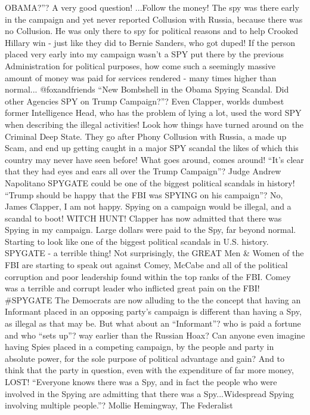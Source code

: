 OBAMA?''? A very good question! ...Follow the money! The spy was there
early in the campaign and yet never reported Collusion with Russia,
because there was no Collusion. He was only there to spy for political
reasons and to help Crooked Hillary win - just like they did to Bernie
Sanders, who got duped! If the person placed very early into my campaign
wasn't a SPY put there by the previous Administration for political
purposes, how come such a seemingly massive amount of money was paid for
services rendered - many times higher than normal... @foxandfriends
``New Bombshell in the Obama Spying Scandal. Did other Agencies SPY on
Trump Campaign?''? Even Clapper, worlds dumbest former Intelligence
Head, who has the problem of lying a lot, used the word SPY when
describing the illegal activities! Look how things have turned around on
the Criminal Deep State. They go after Phony Collusion with Russia, a
made up Scam, and end up getting caught in a major SPY scandal the likes
of which this country may never have seen before! What goes around,
comes around! ``It's clear that they had eyes and ears all over the
Trump Campaign''? Judge Andrew Napolitano SPYGATE could be one of the
biggest political scandals in history! ``Trump should be happy that the
FBI was SPYING on his campaign''? No, James Clapper, I am not happy.
Spying on a campaign would be illegal, and a scandal to boot! WITCH
HUNT! Clapper has now admitted that there was Spying in my campaign.
Large dollars were paid to the Spy, far beyond normal. Starting to look
like one of the biggest political scandals in U.S. history. SPYGATE - a
terrible thing! Not surprisingly, the GREAT Men \& Women of the FBI are
starting to speak out against Comey, McCabe and all of the political
corruption and poor leadership found within the top ranks of the FBI.
Comey was a terrible and corrupt leader who inflicted great pain on the
FBI! \#SPYGATE The Democrats are now alluding to the the concept that
having an Informant placed in an opposing party's campaign is different
than having a Spy, as illegal as that may be. But what about an
``Informant''? who is paid a fortune and who ``sets up''? way earlier
than the Russian Hoax? Can anyone even imagine having Spies placed in a
competing campaign, by the people and party in absolute power, for the
sole purpose of political advantage and gain? And to think that the
party in question, even with the expenditure of far more money, LOST!
``Everyone knows there was a Spy, and in fact the people who were
involved in the Spying are admitting that there was a Spy...Widespread
Spying involving multiple people.''? Mollie Hemingway, The Federalist
